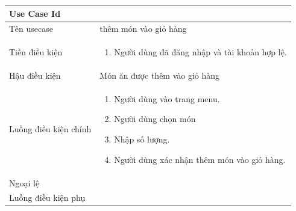 \begin{center}{\color{black}}

    \begin{tabular}{|p{5cm}|p{7cm}|} 
        \hline
        \textbf{Use Case Id} & \textbf{}  \\ \hline
        Tên usecase &  thêm món vào giỏ hàng\\ \hline
        Tiền điều kiện &    \begin{enumerate}
            \item Người dùng đã đăng nhập và tài khoản hợp lệ.
        \end{enumerate}\\ \hline
        Hậu điều kiện & Món ăn được thêm vào giỏ hàng\\ \hline
        Luồng điều kiện chính &  
            \begin{enumerate}
                \item Người dùng vào trang menu.
                \item Người dùng chọn món
                \item Nhập số lượng.
				\item Người dùng xác nhận thêm món vào giỏ hàng.
            \end{enumerate}\\
        \hline
        Ngoại lệ &  \\ \hline
        Luồng điều kiện phụ &  \\ \hline
    \end{tabular}
\end{center}

